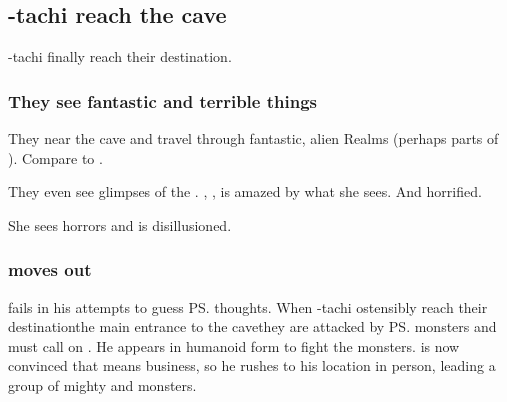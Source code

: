 \subsection{\Shilred-tachi reach the cave}
\Shilred-tachi finally reach their destination. 





\subsubsection{They see fantastic and terrible things}
They near the cave and travel through fantastic, alien Realms (perhaps parts of ). Compare to . 

They even see glimpses of the \xss. 
\Shilred{}, , is amazed by what she sees. And horrified.


She sees horrors and is disillusioned. 







\subsubsection{\Teshrial{} moves out}
\Teshrial{} fails in his attempts to guess \ps{\Ishnaruchaefir} thoughts. 
When \Shilred-tachi ostensibly reach their destination\dash the main entrance to the cave\dash they are attacked by \ps{\Teshrial} monsters and must call on \Ishnaruchaefir. 
He appears in humanoid form to fight the monsters. 
\Teshrial{} is now convinced that \Ishnaruchaefir{} means business, so he rushes to his location in person, leading a group of mighty \banes{} and monsters. 





